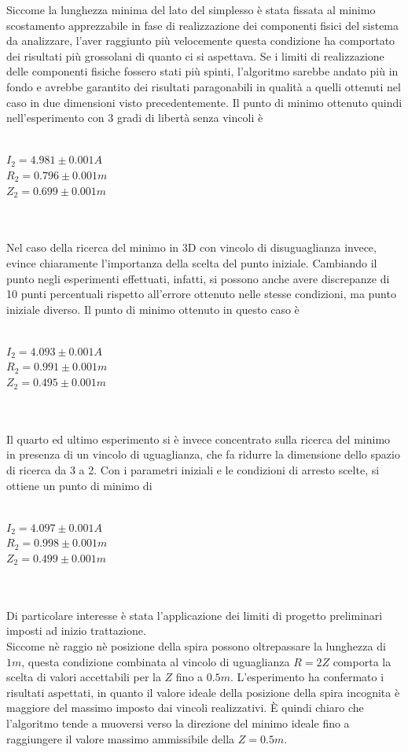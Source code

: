 \documentclass[a4paper, 11pt]{article}
\begin{document}
Siccome la lunghezza minima del lato del simplesso è stata fissata al minimo
scostamento apprezzabile in fase di realizzazione dei componenti fisici del
sistema da analizzare, l'aver raggiunto più velocemente questa condizione ha
comportato dei risultati più grossolani di quanto ci si aspettava. Se i limiti
di realizzazione delle componenti fisiche fossero stati più spinti, l'algoritmo
sarebbe andato più in fondo e avrebbe garantito dei risultati paragonabili in
qualità a quelli ottenuti nel caso in due dimensioni visto precedentemente. Il
punto di minimo ottenuto quindi nell'esperimento con 3 gradi di libertà senza
vincoli è \\ \\
\centerline{ $I_{2} = 4.981 \pm 0.001 A$ \\ $R_{2} = 0.796 \pm 0.001m$ \\ $Z_{2}
= 0.699 \pm 0.001m$} \\ \\
Nel caso della ricerca del minimo in 3D con vincolo di disuguaglianza invece,
evince chiaramente l'importanza della scelta del punto iniziale. Cambiando il
punto negli esperimenti effettuati, infatti, si possono anche avere discrepanze
di 10 punti percentuali rispetto all'errore ottenuto nelle stesse condizioni, ma
punto iniziale diverso. Il punto di minimo ottenuto in questo caso è \\ \\
\centerline{ $I_{2} = 4.093 \pm 0.001 A$ \\ $R_{2} = 0.991 \pm 0.001m$ \\ $Z_{2}
= 0.495 \pm 0.001m$} \\ \\
Il quarto ed ultimo esperimento si è invece concentrato sulla ricerca del minimo
in presenza di un vincolo di uguaglianza, che fa ridurre la dimensione dello
spazio di ricerca da 3 a 2. Con i parametri iniziali e le condizioni di arresto
scelte, si ottiene un punto di minimo di \\ \\
\centerline{ $I_{2} = 4.097 \pm 0.001 A$ \\ $R_{2} = 0.998 \pm 0.001m$ \\ $Z_{2}
= 0.499 \pm 0.001m$} \\ \\
Di particolare interesse è stata l'applicazione dei limiti di progetto
preliminari imposti ad inizio trattazione. \\ 
Siccome nè raggio nè posizione della spira possono oltrepassare la lunghezza di
$1m$, questa condizione combinata al vincolo di uguaglianza $R = 2Z$ comporta la
scelta di valori accettabili per la $Z$ fino a $0.5m$. L'esperimento ha
confermato i risultati aspettati, in quanto il valore ideale della posizione
della spira incognita è maggiore del massimo imposto dai vincoli realizzativi. È
quindi chiaro che l'algoritmo tende a muoversi verso la direzione del minimo
ideale fino a raggiungere il valore massimo ammissibile della $Z = 0.5m$.
\end{document}
